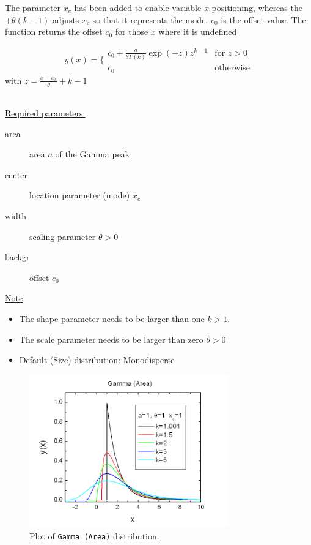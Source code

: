   The parameter $x_c$ has been added to enable variable $x$ positioning,
  whereas the $+\theta(k-1)$ adjusts $x_c$ so that it represents the mode.
  $c_0$ is the offset value.
  The function returns the offset $c_0$ for those $x$ where it is undefined

\begin{equation}
       y(x) = \Bigg\{
       \begin{array}{ll}
           c_0 + \frac{a}{\theta\Gamma(k)} \exp(-z) z^{k-1} & \mbox{for } z > 0 \\
           c_0 &  \mbox{otherwise}
       \end{array}
\end{equation}
with $z=\frac{x-x_c}{\theta} +k-1$

~\\

\underline{Required parameters:}
\begin{description}
    \item[area] area $a$ of the Gamma peak
    \item[center] location parameter (mode) $x_c$
    \item[width] scaling parameter $\theta>0$
    \item[backgr] offset $c_0$
\end{description}

\underline{Note}
\begin{itemize}
  \item The shape parameter needs to be larger than one $k>1$.
  \item The scale parameter needs to be larger than zero $\theta>0$
  \item Default (Size) distribution: Monodisperse
\end{itemize}


\begin{figure}[htb]
\begin{center}
\includegraphics[width=0.768\textwidth]{GammaArea.png}
\end{center}
\caption{Plot of \texttt{Gamma (Area)} distribution.}
\label{fig:GammaArea}
\end{figure}


